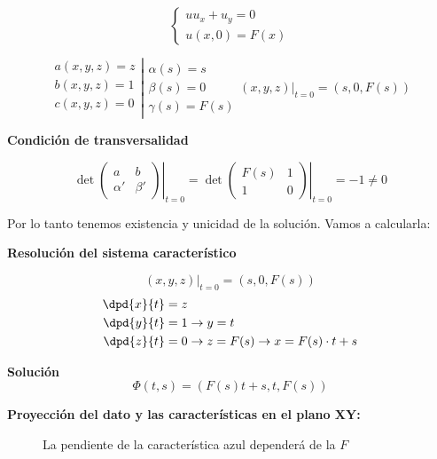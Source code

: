 	\begin{example}[1]
		\[\left\{ \begin{array}{l} uu_x + u_y = 0 \\ u(x,0) = F(x) \end{array}\right.\]

		\[ \left.\begin{array}{r}
		a(x,y,z) = z \\
		b(x,y,z) = 1 \\
		c(x,y,z) = 0 \\
		\end{array} \right| \begin{array}{l}
		\alpha(s) = s \\
		\beta(s) = 0 \\
		\gamma(s) = F(s) \end{array}
		(x,y,z)|_{t=0} = (s,0,F(s))
		\]

		\textbf{Condición de transversalidad}

		\[\det \left.\begin{pmatrix}
		a & b \\
		\alpha' & \beta'
		\end{pmatrix} \right|_{t=0}  = \det \left. \begin{pmatrix}
		F(s) & 1 \\
		1 & 0
		\end{pmatrix} \right|_{t=0} = -1 \neq 0\]

		Por lo tanto tenemos existencia y unicidad de la solución. Vamos a calcularla:

		\textbf{Resolución del sistema característico}

		\[ (x,y,z) |_{t=0} = (s,0,F(s)) \]
		\begin{align*}
		\dpd{x}{t} &= z \\
		\dpd{y}{t} &= 1 \rightarrow y = t \\
		\dpd{z}{t} &= 0 \rightarrow z = F(s) \rightarrow x = F(s)\cdot t + s
		\end{align*}


		\textbf{Solución}
		\[\Phi(t,s) = (F(s)t+s, t, F(s))\]

		{\bf Proyección del dato y las características en el plano XY:}

		\begin{figure}[hbtp]
			\caption{La pendiente de la característica azul dependerá de la $F$}
			\label{fig:Ejemplo-02-09-proyXY}
		\end{figure}


\end{example}
